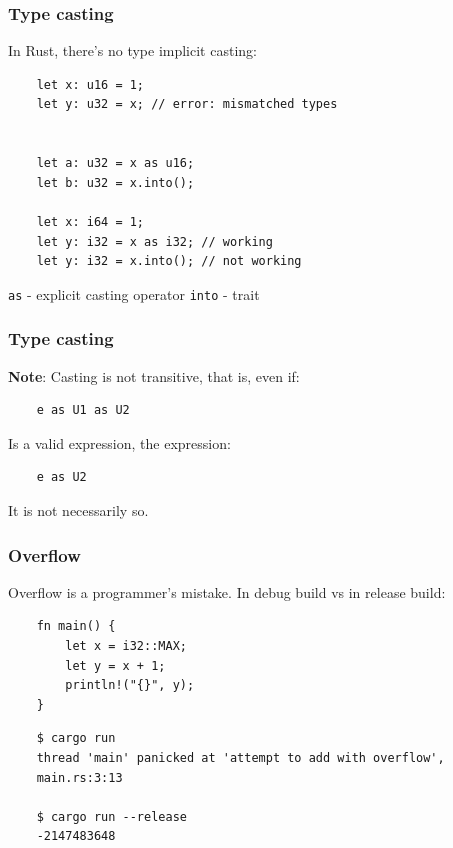 \documentclass[aspectratio=1610,t]{beamer}
\begin{document}

\begin{frame}[fragile]
\frametitle{Type casting}
In Rust, there's no type implicit casting:

\begin{verbatim}
    let x: u16 = 1;
    let y: u32 = x; // error: mismatched types 

    
    let a: u32 = x as u16;
    let b: u32 = x.into();

    let x: i64 = 1;
    let y: i32 = x as i32; // working
    let y: i32 = x.into(); // not working
\end{verbatim}

\texttt{as} - explicit casting operator \newline
\texttt{into} - trait
\end{frame}


\begin{frame}[fragile]
\frametitle{Type casting}
\textbf{Note}: Casting is not transitive, that is, even if:

\begin{verbatim}
    e as U1 as U2
\end{verbatim}

Is a valid expression, the expression:

\begin{verbatim}
    e as U2
\end{verbatim}

It is not necessarily so.
\end{frame}


\begin{frame}[fragile]
\frametitle{Overflow}
Overflow is a programmer's mistake. In debug build vs in release build:

\begin{verbatim}
    fn main() {
        let x = i32::MAX;
        let y = x + 1;
        println!("{}", y);
    }
\end{verbatim}

\begin{verbatim}
    $ cargo run
    thread 'main' panicked at 'attempt to add with overflow',
    main.rs:3:13

    $ cargo run --release
    -2147483648
\end{verbatim}
\end{frame}
\end{document}
